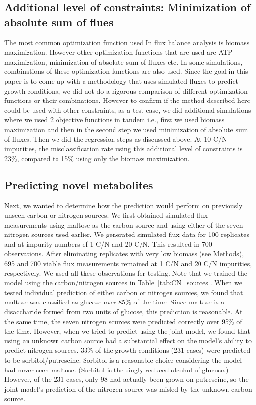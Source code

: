 \documentclass[12pt]{article}
\begin{document}
\subsection{Additional level of constraints: Minimization of absolute sum of flues}
The most common optimization function used In flux balance analysis is biomass maximization. However other optimization functions that are used are ATP maximization, minimization of absolute sum of fluxes etc. In some simulations, combinations of these optimization functions are also used. Since the goal in this paper is to come up with a methodology that uses simulated fluxes to predict growth conditions, we did not do a rigorous comparison of different optimization functions or their combinations. However to confirm if the method described here could be used with other constraints, as a test case, we did additional simulations where we used 2 objective functions in tandem i.e., first we used biomass maximization and then in the second step we used minimization of absolute sum of fluxes. Then we did the regression steps as discussed above. At 10 C/N impurities, the misclassification rate using this additional level of constraints is 23\%, compared to 15\% using only the biomass maximization.

\subsection{Predicting novel metabolites}

Next, we wanted to determine how the prediction would perform on previously unseen carbon or nitrogen sources. We first obtained simulated flux measurements using maltose as the carbon source and using either of the seven nitrogen sources used earlier. We generated simulated flux data for 100 replicates and at impurity numbers of 1 C/N and 20 C/N. This resulted in 700 observations. After eliminating replicates with very low biomass (see Methods), 695 and 700 viable flux measurements remained at 1 C/N and 20 C/N impurities, respectively. We used all these observations for testing. Note that we trained the model using the carbon/nitrogen sources in Table~\ref{tab:CN_sources}. When we tested individual prediction of either carbon or nitrogen sources, we found that maltose was classified as glucose over 85\% of the time. Since maltose is a disaccharide formed from two units of glucose, this prediction is reasonable. At the same time, the seven nitrogen sources were predicted correctly over 95\% of the time. However, when we tried to predict using the joint model, we found that using an unknown carbon source had a substantial effect on the model's ability to predict nitrogen sources. 33\% of the growth conditions (231 cases) were predicted to be sorbitol/putrescine. Sorbitol is a reasonable choice considering the model had never seen maltose. (Sorbitol is the singly reduced alcohol of glucose.) However, of the 231 cases, only 98 had actually been grown on putrescine, so the joint model's prediction of the nitrogen source was misled by the unknown carbon source.
\end{document}
